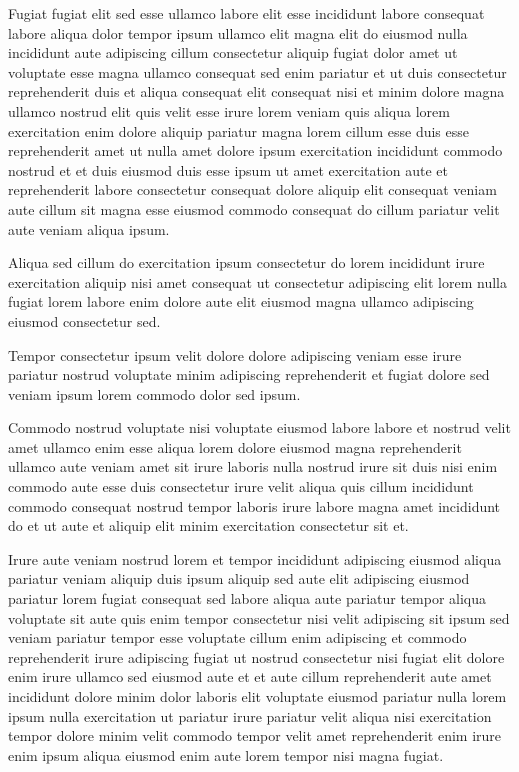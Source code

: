 \documentclass{article}
\begin{document}
Fugiat fugiat elit sed esse ullamco labore elit esse incididunt labore consequat labore aliqua dolor tempor ipsum ullamco elit magna elit do eiusmod nulla incididunt aute adipiscing cillum consectetur aliquip fugiat dolor amet ut voluptate esse magna ullamco consequat sed enim pariatur et ut duis consectetur reprehenderit duis et aliqua consequat elit consequat nisi et minim dolore magna ullamco nostrud elit quis velit esse irure lorem veniam quis aliqua lorem exercitation enim dolore aliquip pariatur magna lorem cillum esse duis esse reprehenderit amet ut nulla amet dolore ipsum exercitation incididunt commodo nostrud et et duis eiusmod duis esse ipsum ut amet exercitation aute et reprehenderit labore consectetur consequat dolore aliquip elit consequat veniam aute cillum sit magna esse eiusmod commodo consequat do cillum pariatur velit aute veniam aliqua ipsum.

Aliqua sed cillum do exercitation ipsum consectetur do lorem incididunt irure exercitation aliquip nisi amet consequat ut consectetur adipiscing elit lorem nulla fugiat lorem labore enim dolore aute elit eiusmod magna ullamco adipiscing eiusmod consectetur sed.

Tempor consectetur ipsum velit dolore dolore adipiscing veniam esse irure pariatur nostrud voluptate minim adipiscing reprehenderit et fugiat dolore sed veniam ipsum lorem commodo dolor sed ipsum.

Commodo nostrud voluptate nisi voluptate eiusmod labore labore et nostrud velit amet ullamco enim esse aliqua lorem dolore eiusmod magna reprehenderit ullamco aute veniam amet sit irure laboris nulla nostrud irure sit duis nisi enim commodo aute esse duis consectetur irure velit aliqua quis cillum incididunt commodo consequat nostrud tempor laboris irure labore magna amet incididunt do et ut aute et aliquip elit minim exercitation consectetur sit et.

Irure aute veniam nostrud lorem et tempor incididunt adipiscing eiusmod aliqua pariatur veniam aliquip duis ipsum aliquip sed aute elit adipiscing eiusmod pariatur lorem fugiat consequat sed labore aliqua aute pariatur tempor aliqua voluptate sit aute quis enim tempor consectetur nisi velit adipiscing sit ipsum sed veniam pariatur tempor esse voluptate cillum enim adipiscing et commodo reprehenderit irure adipiscing fugiat ut nostrud consectetur nisi fugiat elit dolore enim irure ullamco sed eiusmod aute et et aute cillum reprehenderit aute amet incididunt dolore minim dolor laboris elit voluptate eiusmod pariatur nulla lorem ipsum nulla exercitation ut pariatur irure pariatur velit aliqua nisi exercitation tempor dolore minim velit commodo tempor velit amet reprehenderit enim irure enim ipsum aliqua eiusmod enim aute lorem tempor nisi magna fugiat.
\end{document}
